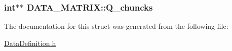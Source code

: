\hypertarget{structDATA__MATRIX_afddbea5ee6d0ab5d894b4ac1dc79681c}{
\subsubsection[{Q\-\_\-chuncks}]{\setlength{\rightskip}{0pt plus 5cm}int$\ast$$\ast$ D\-A\-T\-A\-\_\-\-M\-A\-T\-R\-I\-X\-::\-Q\-\_\-chuncks}}\label{structDATA__MATRIX_afddbea5ee6d0ab5d894b4ac1dc79681c}


The documentation for this struct was generated from the following file\-:\begin{DoxyCompactItemize}
\item 
\hyperlink{DataDefinition_8h}{Data\-Definition.\-h}\end{DoxyCompactItemize}
